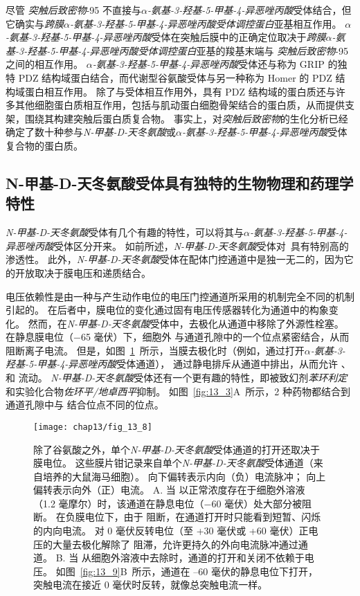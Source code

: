 尽管 \textit{突触后致密物}-95 不直接与\textit{$\alpha$-氨基-3-羟基-5-甲基-4-异恶唑丙酸}受体结合，但它确实与\textit{跨膜$\alpha$-氨基-3-羟基-5-甲基-4-异恶唑丙酸受体调控蛋白}亚基相互作用。
\textit{$\alpha$-氨基-3-羟基-5-甲基-4-异恶唑丙酸}受体在突触后膜中的正确定位取决于\textit{跨膜$\alpha$-氨基-3-羟基-5-甲基-4-异恶唑丙酸受体调控蛋白}亚基的羧基末端与 \textit{突触后致密物}-95 之间的相互作用。
\textit{$\alpha$-氨基-3-羟基-5-甲基-4-异恶唑丙酸}受体还与称为 GRIP 的独特 PDZ 结构域蛋白结合，而代谢型谷氨酸受体与另一种称为 Homer 的 PDZ 结构域蛋白相互作用。
除了与受体相互作用外，具有 PDZ 结构域的蛋白质还与许多其他细胞蛋白质相互作用，包括与肌动蛋白细胞骨架结合的蛋白质，从而提供支架，围绕其构建突触后蛋白质复合物。
事实上，对\textit{突触后致密物}的生化分析已经确定了数十种参与\textit{N-甲基-D-天冬氨酸}或\textit{$\alpha$-氨基-3-羟基-5-甲基-4-异恶唑丙酸}受体复合物的蛋白质。



\subsection{N-甲基-D-天冬氨酸受体具有独特的生物物理和药理学特性}

\textit{N-甲基-D-天冬氨酸}受体有几个有趣的特性，可以将其与\textit{$\alpha$-氨基-3-羟基-5-甲基-4-异恶唑丙酸}受体区分开来。
如前所述，\textit{N-甲基-D-天冬氨酸}受体对~具有特别高的渗透性。
此外，\textit{N-甲基-D-天冬氨酸}受体在配体门控通道中是独一无二的，因为它的开放取决于膜电压和递质结合。


电压依赖性是由一种与产生动作电位的电压门控通道所采用的机制完全不同的机制引起的。
在后者中，膜电位的变化通过固有电压传感器转化为通道中的构象变化。
然而，在\textit{N-甲基-D-天冬氨酸}受体中，去极化从通道中移除了外源性栓塞。
在静息膜电位（−65 毫伏）下，细胞外  与通道孔隙中的一个位点紧密结合，从而阻断离子电流。
但是，如图~\ref{fig:13_8}~所示，当膜去极化时（例如，通过打开\textit{$\alpha$-氨基-3-羟基-5-甲基-4-异恶唑丙酸}受体通道）， 通过静电排斥从通道中排出，从而允许 、 和  流动。 
\textit{N-甲基-D-天冬氨酸}受体还有一个更有趣的特性，即被致幻剂\textit{苯环利定}和实验化合物\textit{佐环平/地卓西平}抑制。
如图~\ref{fig:13_3}A~所示，2 种药物都结合到通道孔隙中与  结合位点不同的位点。


\begin{figure}[htbp]
	\centering
	\texttt{[image: chap13/fig\_13\_8]}
	\caption{除了谷氨酸之外，单个\textit{N-甲基-D-天冬氨酸}受体通道的打开还取决于膜电位。
		这些膜片钳记录来自单个\textit{N-甲基-D-天冬氨酸}受体通道（来自培养的大鼠海马细胞）。
		向下偏转表示内向（负）电流脉冲；
		向上偏转表示向外（正）电流。
		A. 当  以正常浓度存在于细胞外溶液（1.2 毫摩尔）时，该通道在静息电位（−60 毫伏）处大部分被阻断。
		在负膜电位下，由于  阻断，在通道打开时只能看到短暂、闪烁的内向电流。
		对 0 毫伏反转电位（至 +30 毫伏或 +60 毫伏）正电压的大量去极化解除了  阻滞，允许更持久的外向电流脉冲通过通道。
		B. 当  从细胞外溶液中去除时，通道的打开和关闭不依赖于电压。
		如图~\ref{fig:13_9}B~所示，通道在 –60 毫伏的静息电位下打开，突触电流在接近 0 毫伏时反转，就像总突触电流一样。}
	\label{fig:13_8}
\end{figure}


